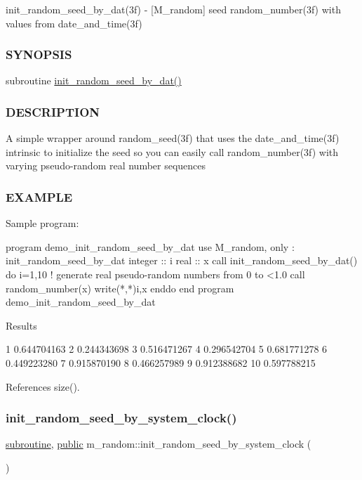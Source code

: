 init\+\_\+random\+\_\+seed\+\_\+by\+\_\+dat(3f) -\/ \mbox{[}M\+\_\+random\mbox{]} seed random\+\_\+number(3f) with values from date\+\_\+and\+\_\+time(3f) \subsubsection*{S\+Y\+N\+O\+P\+S\+IS}

subroutine \hyperlink{namespacem__random_a6e3975f994c77778043f3e5d00614317}{init\+\_\+random\+\_\+seed\+\_\+by\+\_\+dat()} \subsubsection*{D\+E\+S\+C\+R\+I\+P\+T\+I\+ON}

A simple wrapper around random\+\_\+seed(3f) that uses the date\+\_\+and\+\_\+time(3f) intrinsic to initialize the seed so you can easily call random\+\_\+number(3f) with varying pseudo-\/random real number sequences \subsubsection*{E\+X\+A\+M\+P\+LE}

\begin{DoxyVerb}Sample program:

 program demo_init_random_seed_by_dat
 use M_random, only : init_random_seed_by_dat
 integer :: i
 real    :: x
    call init_random_seed_by_dat()
    do i=1,10
       ! generate real pseudo-random numbers from 0 to <1.0
       call random_number(x)
       write(*,*)i,x
    enddo
 end program demo_init_random_seed_by_dat

Results

        1  0.644704163
        2  0.244343698
        3  0.516471267
        4  0.296542704
        5  0.681771278
        6  0.449223280
        7  0.915870190
        8  0.466257989
        9  0.912388682
       10  0.597788215 \end{DoxyVerb}
 

References size().

\mbox{\label{namespacem__random_a887216bea7a75b314e538afd3ebe2ff3}} 
\subsubsection{\texorpdfstring{init\+\_\+random\+\_\+seed\+\_\+by\+\_\+system\+\_\+clock()}{init\_random\_seed\_by\_system\_clock()}}
{\footnotesize\ttfamily \hyperlink{M__stopwatch_83_8txt_acfbcff50169d691ff02d4a123ed70482}{subroutine}, \hyperlink{M__stopwatch_83_8txt_a2f74811300c361e53b430611a7d1769f}{public} m\+\_\+random\+::init\+\_\+random\+\_\+seed\+\_\+by\+\_\+system\+\_\+clock (\begin{DoxyParamCaption}{ }\end{DoxyParamCaption})}



